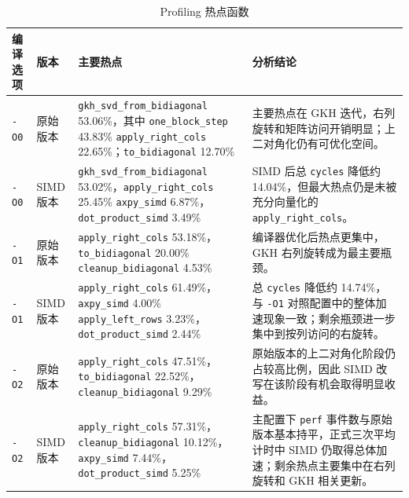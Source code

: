 \documentclass[UTF8,a4paper]{ctexart}
\renewcommand{\arraystretch}{1.08}
\begin{document}
\begin{table}[H]
  \centering
  \small
  \renewcommand{\arraystretch}{1.20}
  \begin{tabularx}{\textwidth}{L{1.20cm}L{1.7cm}L{6cm}Y}
    \toprule
    \textbf{编译选项} & \textbf{版本} & \textbf{主要热点} & \textbf{分析结论} \\
    \midrule
    \texttt{-O0} & 原始版本 & \texttt{gkh\_svd\_from\_bidiagonal} 53.06\%，\newline 其中 \texttt{one\_block\_step} 43.83\% \newline \texttt{apply\_right\_cols} 22.65\%；\newline \texttt{to\_bidiagonal} 12.70\% & 主要热点在 GKH 迭代，右列旋转和矩阵访问开销明显；上二对角化仍有可优化空间。 \\
    \texttt{-O0} & SIMD 版本 & \texttt{gkh\_svd\_from\_bidiagonal} 53.02\%，\newline \texttt{apply\_right\_cols} 25.45\% \newline \texttt{axpy\_simd} 6.87\%，\newline \texttt{dot\_product\_simd} 3.49\% & SIMD 后总 \texttt{cycles} 降低约 14.04\%，但最大热点仍是未被充分向量化的 \texttt{apply\_right\_cols}。 \\
    \addlinespace[0.25em]
    \texttt{-O1} & 原始版本 & \texttt{apply\_right\_cols} 53.18\%，\newline \texttt{to\_bidiagonal} 20.00\% \newline \texttt{cleanup\_bidiagonal} 4.53\% & 编译器优化后热点更集中，GKH 右列旋转成为最主要瓶颈。 \\
    \texttt{-O1} & SIMD 版本 & \texttt{apply\_right\_cols} 61.49\%，\newline \texttt{axpy\_simd} 4.00\% \newline\texttt{apply\_left\_rows} 3.23\%， \newline \texttt{dot\_product\_simd} 2.44\% & 总 \texttt{cycles} 降低约 14.74\%，与 \texttt{-O1} 对照配置中的整体加速现象一致；剩余瓶颈进一步集中到按列访问的右旋转。 \\
    \addlinespace[0.25em]
    \texttt{-O2} & 原始版本 & \texttt{apply\_right\_cols} 47.51\%，\newline \texttt{to\_bidiagonal} 22.52\%，\newline \texttt{cleanup\_bidiagonal} 9.29\% & 原始版本的上二对角化阶段仍占较高比例，因此 SIMD 改写在该阶段有机会取得明显收益。 \\
    \texttt{-O2} & SIMD 版本 & \texttt{apply\_right\_cols} 57.31\%，\newline \texttt{cleanup\_bidiagonal} 10.12\%，\newline \texttt{axpy\_simd} 7.44\%，\newline \texttt{dot\_product\_simd} 5.25\% & 主配置下 \texttt{perf} 事件数与原始版本基本持平，正式三次平均计时中 SIMD 仍取得总体加速；剩余热点主要集中在右列旋转和 GKH 相关更新。 \\
    \bottomrule
  \end{tabularx}
  \renewcommand{\arraystretch}{1.08}
  \caption{Profiling 热点函数}
  \label{tab:profiling}
\end{table}
\end{document}
